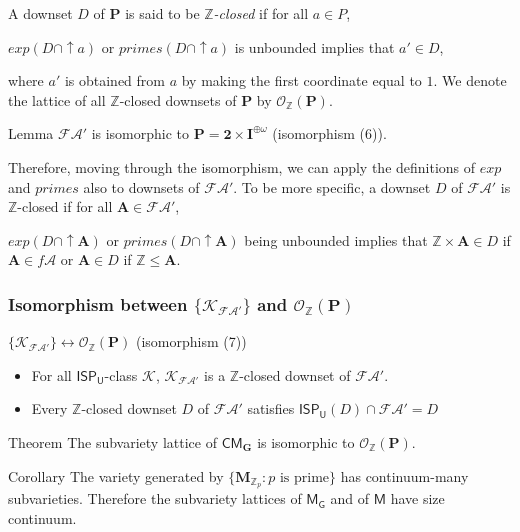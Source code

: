\documentclass[professionalfont, 10pt]{beamer} %
\theoremstyle{plain}
\theoremstyle{definition}
\newcommand{\m}[1]{{\mathbf {#1} }}
\newcommand{\bb}[1]{\mathbb {#1}}
\begin{document}
\begin{frame}
A downset $D$ of $\m{P}$ is said to be \emph{$\bb{Z}$-closed} if for all $a \in P$, 
\begin{center}
$exp(D \cap {\uparrow} a)$ or $primes(D \cap {\uparrow} a)$ is unbounded implies that $a' \in D$,
\end{center}
where $a'$ is obtained from $a$ by making the first coordinate equal to $1$.
We denote the lattice of all $\bb{Z}$-closed downsets of $\m{P}$ by $\mathcal{O}_{\bb{Z}}(\m{P})$.\pause

\begin{block}{Lemma}
    $\mathcal{FA}'$ is isomorphic to $\m P = \m 2 \times \m I^{\oplus \omega}$ (isomorphism (6)).
\end{block}
\pause

Therefore, moving through the isomorphism, we can apply the definitions of $exp$ and $primes$ also to downsets of $\mathcal{FA}'$.
To be more specific, a downset $D$ of $\mathcal{FA}'$ is $\bb{Z}$-closed if for all $\m A \in \mathcal{FA}'$,
\begin{center}
    $exp(D \cap {\uparrow} \m A)$ or $primes(D \cap {\uparrow} \m A)$ being unbounded implies that $\bb{Z} \times \m A \in D$ if $\m A \in f\mathcal{A}$ or $\m A \in D$ if $\bb{Z} \leq \m A$.
\end{center}
\end{frame}

\begin{frame}
\frametitle{Isomorphism between $\{\mathcal{K}_{\mathcal{FA}'}\}$ and $\mathcal{O}_{\bb{Z}}(\m P)$}

\begin{block}{$\{\mathcal{K}_{\mathcal{FA}'}\} \leftrightarrow \mathcal{O}_{\bb{Z}}(\m P)$ (isomorphism (7))}
\begin{itemize}
    \item For all $\mathsf{ISP_U}$-class $\mathcal{K}$, $\mathcal{K}_{\mathcal{FA}'}$ is a $\bb{Z}$-closed downset of $\mathcal{FA}'$.

    \item Every $\bb{Z}$-closed downset $D$ of $\mathcal{FA}'$ satisfies $\mathsf{ISP_U}(D) \cap \mathcal{FA}' = D$
\end{itemize}
\end{block}
\pause
\begin{block}{Theorem}
    The subvariety lattice of $\mathsf{CM}_{\mathbf{G}}$ is isomorphic to $\mathcal{O}_{\mathbb{Z}}(\m P)$.
\end{block}
\pause
\begin{block}{Corollary}
    The variety generated by $\{\m M_{\mathbb{Z}_p}: p \text{ is prime}\}$ has continuum-many subvarieties. 
    Therefore the subvariety lattices of $\mathsf{M_G}$ and of $\mathsf{M}$ have size continuum.
\end{block}

\end{frame}
\end{document}
